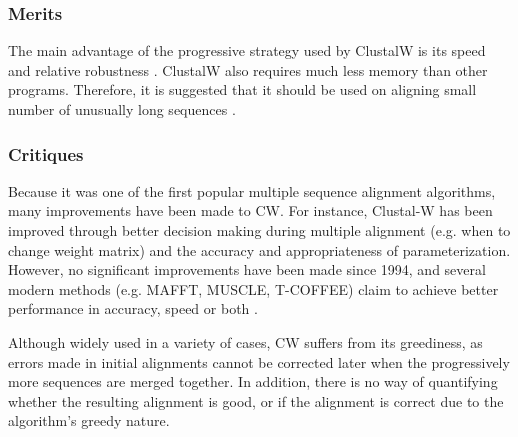 \documentclass[10pt,twocolumn]{article}
\begin{document}
\subsubsection*{Merits}
The main advantage of the progressive strategy used by ClustalW is its speed and relative robustness \cite{notredame2000t}. ClustalW also requires much less memory than other programs. Therefore, it is suggested that it should be used on aligning small number of unusually long sequences \cite{edgar2006multiple}.

\subsubsection*{Critiques}
Because it was one of the first popular multiple sequence alignment algorithms, many improvements have been made to CW. For instance, Clustal-W has been improved through better decision making during multiple alignment (e.g. when to change weight matrix) and the accuracy and appropriateness of parameterization. However, no significant improvements have been made since 1994, and several modern methods (e.g. MAFFT, MUSCLE, T-COFFEE) claim to achieve better performance in accuracy, speed or both \cite{edgar2006multiple}.

Although widely used in a variety of cases, CW suffers from its greediness, as errors made in initial alignments cannot be corrected later when the progressively more sequences are merged together\cite{tamura2004prospects}. In addition, there is no way of quantifying whether the resulting alignment is good, or if the alignment is correct due to the algorithm's greedy nature.
\end{document}
